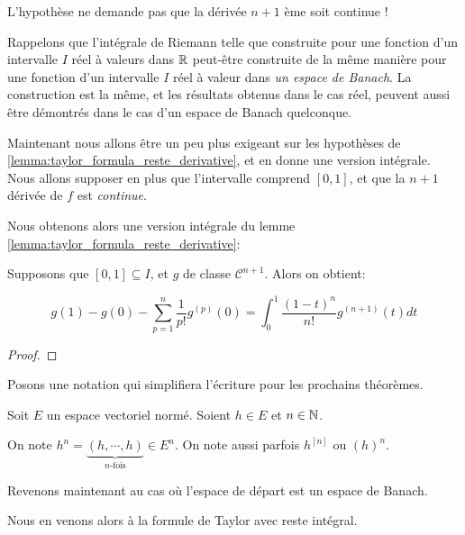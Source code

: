 \begin{remarque}
	L'hypothèse ne demande pas que la dérivée $n + 1$ ème soit continue !
\end{remarque}

Rappelons que l'intégrale de Riemann telle que construite pour une fonction d'un
intervalle $I$ réel à valeurs dans $\mathbb{R}$  peut-être construite de la même
manière pour une fonction d'un intervalle $I$ réel à valeur dans \textit{un
espace de Banach}. La construction est la même, et les résultats obtenus dans le
cas réel, peuvent aussi être démontrés dans le cas d'un espace de Banach
quelconque.

Maintenant nous allons être un peu plus exigeant sur les hypothèses de
\ref{lemma:taylor_formula_reste_derivative}, et en donne une version intégrale.
Nous allons supposer en plus que l'intervalle comprend $[0, 1]$, et que la $n +
1$ dérivée de $f$ est \textit{continue}.

Nous obtenons alors une version intégrale du lemme
\ref{lemma:taylor_formula_reste_derivative}:

\begin{corollary}
	\label{corollary:taylor_formula_reste_integral}
	Supposons que $[0, 1] \subseteq I$, et $g$ de classe $\mathcal{C}^{n + 1}$.
	Alors on obtient:

	\begin{equation*}
		g(1) - g(0) - \displaystyle \sum_{p = 1}^{n} \frac{1}{p!} g^{(p)}(0) =
		\int_{0}^{1} \frac{(1 - t)^{n}}{n!} g^{(n + 1)}(t) dt
	\end{equation*}
\end{corollary}

\ifdefined\outputproof
\begin{proof}

\end{proof}
\fi

Posons une notation qui simplifiera l'écriture pour les prochains théorèmes.

\begin{notation}
	Soit $E$ un espace vectoriel normé. Soient $h \in E$ et $n \in \mathbb{N}$.

	On note $h^{n} = \underbrace{(h, \cdots, h)}_{\text{$n$-fois}} \in E^{n}$.
	On note aussi parfois $h^{[n]}$ ou $(h)^{n}$.
\end{notation}

Revenons maintenant au cas où l'espace de départ est un espace de Banach.

Nous en venons alors à la formule de Taylor avec reste intégral.

